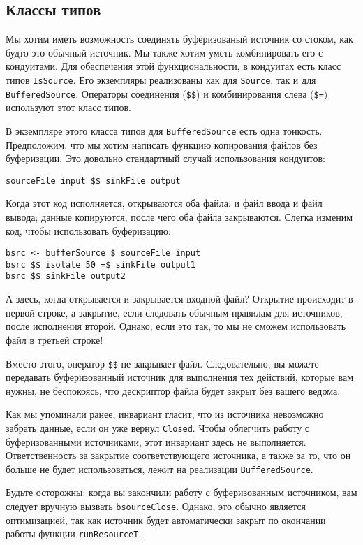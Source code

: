 \subsection{Классы типов}
Мы хотим иметь возможность соединять буферизованый источник со стоком,
как будто это обычный источник.
Мы также хотим уметь комбинировать его с кондуитами. Для обеспечения этой функциональности,
в кондуитах есть класс типов \lstinline'IsSource'. Его экземпляры реализованы как для
\lstinline'Source', так и для \lstinline'BufferedSource'.
Операторы соединения (\lstinline'$$') и комбинирования слева (\lstinline'$=') используют этот класс типов.

В экземпляре этого класса типов для \lstinline'BufferedSource' есть одна тонкость.
Предположим, что мы хотим написать функцию копирования файлов без
буферизации. Это довольно стандартный случай использования кондуитов:
\begin{lstlisting}
sourceFile input $$ sinkFile output
\end{lstlisting}%
Когда этот код исполняется, открываются оба файла: и файл ввода и файл вывода; данные
копируются, после чего оба файла закрываются. Слегка изменим код, чтобы
использовать буферизацию:
\begin{lstlisting}
bsrc <- bufferSource $ sourceFile input
bsrc $$ isolate 50 =$ sinkFile output1
bsrc $$ sinkFile output2
\end{lstlisting}
А здесь, когда открывается и закрывается входной файл? Открытие
происходит в первой строке, а закрытие, если следовать обычным
правилам для источников, после исполнения второй.
Однако, если это так, то мы не сможем использовать файл в третьей строке!

Вместо этого, оператор \lstinline!$$! не закрывает файл. Следовательно, вы можете
передавать буферизованный источник для выполнения тех действий, которые вам
нужны, не беспокоясь, что дескриптор файла будет закрыт без вашего ведома.

\begin{remark}
Как мы упоминали ранее, инвариант гласит, что из источника невозможно забрать
данные, если он уже вернул \lstinline{Closed}. Чтобы облегчить работу с буферизованными
источниками, этот инвариант здесь не выполняется. Ответственность за закрытие
соответствующего источника, а также за то, что он больше не будет использоваться,
лежит на реализации \lstinline'BufferedSource'.
\end{remark}

Будьте осторожны: когда вы закончили работу с буферизованным источником, вам
следует вручную вызвать \lstinline'bsourceClose'. Однако, это обычно является
оптимизацией, так как источник будет автоматически закрыт по окончании
работы функции \lstinline'runResourceT'.

